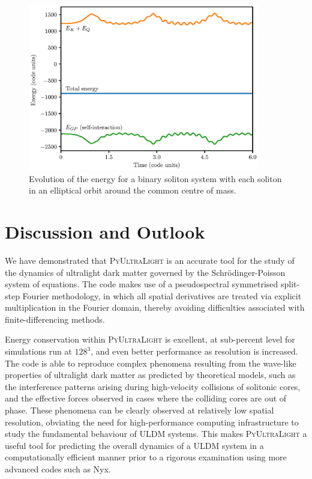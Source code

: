 \documentclass[a4paper,11pt]{article}
\newcommand{\PyUltraLight}{\textsc{PyUltraLight}\xspace}
\begin{document}
\begin{figure}
  \includegraphics[width=0.9\textwidth,trim=0 0 2cm 2cm,clip]{egy_m=22.eps}
  \caption{Evolution of the energy for a binary soliton system with each soliton in an elliptical orbit around the common centre of mass.}
  \label{fig:binary}
\end{figure}





\section{Discussion and Outlook}

We have demonstrated that \PyUltraLight is an accurate tool for the study of the dynamics of ultralight dark matter governed by the Schr{\"o}dinger-Poisson system of equations. The code makes use of a pseudospectral symmetrised split-step Fourier methodology, in which all spatial derivatives are treated via explicit multiplication in the Fourier domain, thereby avoiding difficulties associated with finite-differencing methods. 

Energy conservation within \PyUltraLight is excellent, at sub-percent level for simulations run at $128^3$, and even better performance as resolution is increased. The code is able to reproduce complex phenomena resulting from the wave-like properties of ultralight dark matter as predicted by theoretical models, such as the interference patterns arising during high-velocity collisions of solitonic cores, and the effective forces observed in cases where the colliding cores are out of phase. These phenomena can be clearly observed at relatively low spatial resolution, obviating the need for high-performance computing infrastructure to study the fundamental behaviour of ULDM systems. This makes \PyUltraLight a useful tool for predicting the overall dynamics of a ULDM system in a computationally efficient manner prior to a rigorous examination using more advanced codes such as Nyx.
\end{document}
